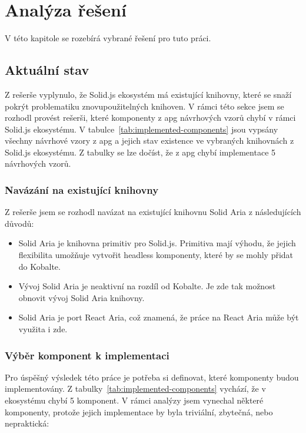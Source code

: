 \chapter{Analýza řešení}
\label{chap:analysis}

V této kapitole se rozebírá vybrané řešení pro tuto práci.

\section{Aktuální stav}

Z rešerše vyplynulo, že Solid.js ekosystém má existující knihovny, které se snaží pokrýt problematiku znovupoužitelných knihoven.
V rámci této sekce jsem se rozhodl provést rešerši, které komponenty z \gls{apg} návrhových vzorů chybí v rámci Solid.js ekosystému.
V tabulce~\ref{tab:implemented-components} jsou vypsány všechny návrhové vzory z \gls{apg} a jejich stav existence ve vybraných knihovnách z Solid.js ekosystému.
Z tabulky se lze dočíst, že z \gls{apg} chybí implementace 5 návrhových vzorů.

\subsection{Navázání na existující knihovny}

Z rešerše jsem se rozhodl navázat na existující knihovnu Solid Aria z následujících důvodů:

\begin{itemize}
      \item Solid Aria je knihovna primitiv pro Solid.js. Primitiva mají výhodu, že jejich flexibilita umožňuje vytvořit headless komponenty, které by se mohly přidat do Kobalte.
      \item Vývoj Solid Aria je neaktivní na rozdíl od Kobalte. Je zde tak možnost obnovit vývoj Solid Aria knihovny.
      \item Solid Aria je port React Aria, což znamená, že práce na React Aria může být využita i zde.
\end{itemize}

\subsection{Výběr komponent k implementaci}

Pro úspěšný výsledek této práce je potřeba si definovat, které komponenty budou implementovány.
Z tabulky~\ref{tab:implemented-components} vychází, že v ekosystému chybí 5 komponent.
V rámci analýzy jsem vynechal některé komponenty, protože jejich implementace by byla triviální, zbytečná, nebo nepraktická:

